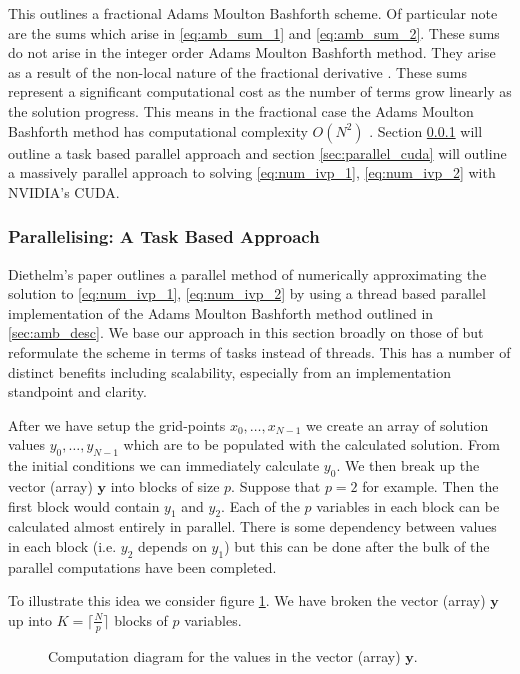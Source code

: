 This outlines a fractional Adams Moulton Bashforth scheme. Of particular note are the sums which arise in \eqref{eq:amb_sum_1} and \eqref{eq:amb_sum_2}. These sums do not arise in the integer order Adams Moulton Bashforth method. They arise as a result of the non-local nature of the fractional derivative \cite{Diethelm2004}. These sums represent a significant computational cost as the number of terms grow linearly as the solution progress. This means in the fractional case the Adams Moulton Bashforth method has computational complexity $ O(N^2) $ \cite{Diethelm2011}. Section \ref{sec:parallel_c} will outline a task based parallel approach and section \ref{sec:parallel_cuda} will outline a massively parallel approach to solving \eqref{eq:num_ivp_1}, \eqref{eq:num_ivp_2} with NVIDIA's CUDA.
\subsubsection{Parallelising: A Task Based Approach}
\label{sec:parallel_c}

Diethelm's paper \cite{Diethelm2011} outlines a parallel method of numerically approximating the solution to \eqref{eq:num_ivp_1}, \eqref{eq:num_ivp_2} by using a thread based parallel implementation of the Adams Moulton Bashforth method outlined in \ref{sec:amb_desc}. We base our approach in this section broadly on those of \cite{Diethelm2011} but reformulate the scheme in terms of tasks instead of threads. This has a number of distinct benefits including scalability, especially from an implementation standpoint and clarity.

After we have setup the grid-points $ x_0, \ldots, x_{N-1} $ we create an array of solution values $ y_0, \ldots, y_{N-1} $ which are to be populated with the calculated solution. From the initial conditions we can immediately calculate $ y_0 $. We then break up the vector (array) $ \mathbf{y} $ into blocks of size $ p $. Suppose that $ p = 2 $ for example. Then the first block would contain $ y_1 $ and $ y_2 $. Each of the $ p $ variables in each block can be calculated almost entirely in parallel. There is some dependency between values in each block (i.e. $ y_2 $ depends on $ y_1 $) but this can be done after the bulk of the parallel computations have been completed.

To illustrate this idea we consider figure \ref{fig:comp_diag}. We have broken the vector (array) $ \mathbf{y} $ up into $ K = \lceil \frac{N}{p} \rceil $ blocks of $ p $ variables.


\begin{figure}[h]

\caption{Computation diagram for the values in the vector (array) $ \mathbf{y} $.}
\label{fig:comp_diag}
\end{figure} 

